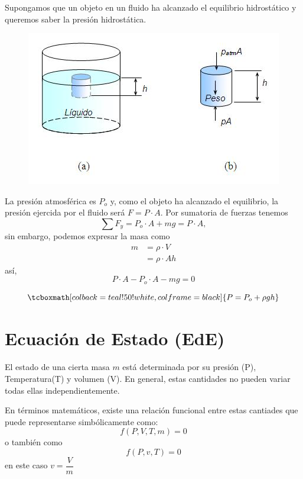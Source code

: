 \documentclass[12pt,twocolumn,a4paper]{report}
\begin{document}
Supongamos que un objeto en un fluido ha alcanzado el equilibrio hidrostático y queremos saber la presión hidrostática.  
\begin{figure}[H]
	\centering	
	\includegraphics[scale=0.85]{graficos/hidrostatica.jpeg}	
\end{figure}

La presión atmosférica es $P_o$ y, como el objeto ha alcanzado el equilibrio, la presión ejercida por el fluido será $F = P\cdot A$. Por sumatoria de fuerzas tenemos
\begin{equation*}
\sum F_y = P_o \cdot A + mg = P\cdot A,
\end{equation*}
sin embargo, podemos expresar la masa como
\begin{align*}
m &= \rho \cdot V \\
  &= \rho \cdot Ah
\end{align*}
así,
\begin{equation*}
P\cdot A - P_o \cdot A - mg = 0
\end{equation*}


\begin{equation*}
\tcboxmath[colback=teal!50!white,colframe=black]{
P=P_o + \rho gh}
\end{equation*}








\chapter*{Ecuación de Estado (EdE)}
El estado de una cierta masa $m$ está determinada por su presión (P), Temperatura(T) y volumen (V). En general, estas cantidades no pueden variar todas ellas independientemente. 

En términos matemáticos, existe una relación funcional entre estas cantiades que puede representarse simbólicamente como:
\begin{equation*}
f(P,V,T,m) = 0
\end{equation*}
o también como 
\begin{equation*}
f(P,v,T) = 0
\end{equation*}
en este caso $v = \dfrac{V}{m}$
\end{document}
